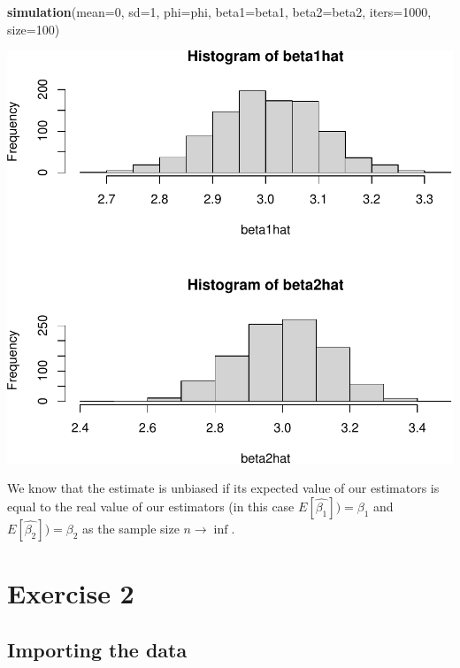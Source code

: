 \documentclass[]{article}
\newenvironment{Shaded}{\begin{snugshade}}{\end{snugshade}}
\newcommand{\DataTypeTok}[1]{\textcolor[rgb]{0.13,0.29,0.53}{#1}}
\newcommand{\DecValTok}[1]{\textcolor[rgb]{0.00,0.00,0.81}{#1}}
\newcommand{\KeywordTok}[1]{\textcolor[rgb]{0.13,0.29,0.53}{\textbf{#1}}}
\newcommand{\NormalTok}[1]{#1}
\begin{document}
\begin{Shaded}
\begin{Highlighting}[]
\KeywordTok{simulation}\NormalTok{(}\DataTypeTok{mean=}\DecValTok{0}\NormalTok{, }\DataTypeTok{sd=}\DecValTok{1}\NormalTok{, }\DataTypeTok{phi=}\NormalTok{phi, }\DataTypeTok{beta1=}\NormalTok{beta1, }\DataTypeTok{beta2=}\NormalTok{beta2, }\DataTypeTok{iters=}\DecValTok{1000}\NormalTok{, }\DataTypeTok{size=}\DecValTok{100}\NormalTok{)}
\end{Highlighting}
\end{Shaded}

\includegraphics{./figures/unnamed-chunk-3-1.pdf}

We know that the estimate is unbiased if its expected value of our
estimators is equal to the real value of our estimators (in this case
\(E[ \hat{\beta_{1}}]) = \beta_{1}\) and
\(E[ \hat{\beta_{2}}]) = \beta_{2}\) as the sample size
\(n \rightarrow \inf\).

\hypertarget{exercise-2}{%
\section{Exercise 2}\label{exercise-2}}

\hypertarget{importing-the-data}{%
\subsection{Importing the data}\label{importing-the-data}}
\end{document}
